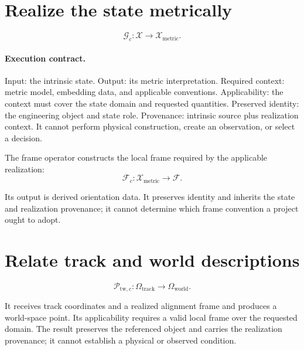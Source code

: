 \section{Realize the state metrically}

\begin{definition}
\label{def:metric-realization-operator}
\[
\mathcal G_c:\mathcal X\rightarrow\mathcal X_{\mathrm{metric}}.
\]
\end{definition}

\paragraph{Execution contract.}
Input: the intrinsic state. Output: its metric interpretation. Required
context: metric model, embedding data, and applicable conventions.
Applicability: the context must cover the state domain and requested
quantities. Preserved identity: the engineering object and state role.
Provenance: intrinsic source plus realization context. It cannot perform
physical construction, create an observation, or select a decision.

\begin{definition}
\label{def:frame-operator}
The frame operator constructs the local frame required by the applicable
realization:
\[
\mathcal F_c:\mathcal X_{\mathrm{metric}}\rightarrow\mathcal F.
\]
\end{definition}

Its output is derived orientation data. It preserves identity and
inherits the state and realization provenance; it cannot determine which
frame convention a project ought to adopt.

\section{Relate track and world descriptions}

\begin{definition}
\label{def:track-to-world-operator}
\[
\mathcal P_{\mathrm{tw},c}:
\Omega_{\mathrm{track}}\rightarrow\Omega_{\mathrm{world}}.
\]
\end{definition}

It receives track coordinates and a realized alignment frame and
produces a world-space point. Its applicability requires a valid local
frame over the requested domain. The result preserves the referenced
object and carries the realization provenance; it cannot establish a
physical or observed condition.

